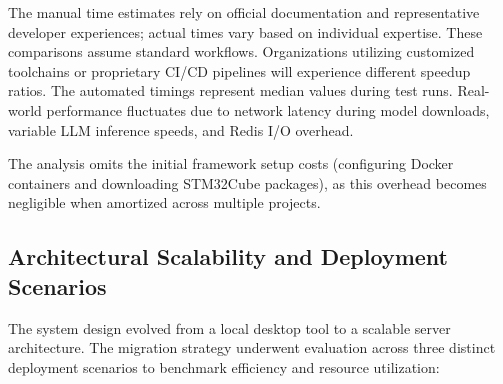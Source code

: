 The manual time estimates rely on official documentation and representative developer experiences; actual times vary based on individual expertise. These comparisons assume standard workflows. Organizations utilizing customized toolchains or proprietary CI/CD pipelines will experience different speedup ratios. The automated timings represent median values during test runs. Real-world performance fluctuates due to network latency during model downloads, variable LLM inference speeds, and Redis I/O overhead.

The analysis omits the initial framework setup costs (configuring Docker containers and downloading STM32Cube packages), as this overhead becomes negligible when amortized across multiple projects.

\subsection{Architectural Scalability and Deployment Scenarios}
\label{sec:scalability_scenarios}

The system design evolved from a local desktop tool to a scalable server architecture. The migration strategy underwent evaluation across three distinct deployment scenarios to benchmark efficiency and resource utilization:

